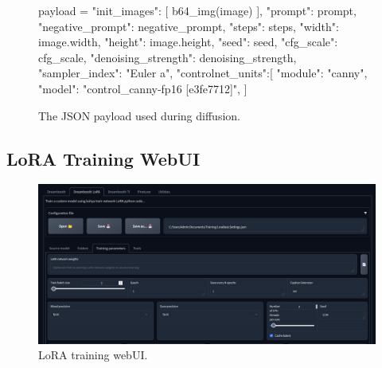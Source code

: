 \documentclass[sn-mathphys,Numbered]{sn-jnl}
\theoremstyle{thmstyleone}%
\theoremstyle{thmstyletwo}%
\theoremstyle{thmstylethree}%
\begin{document}
\begin{figure}
\begin{python}
	payload = {
		"init_images": [
		b64_img(image)
		],
		"prompt": prompt,
		"negative_prompt": negative_prompt,
		"steps": steps,
		"width": image.width,
		"height": image.height,
		"seed": seed,
		"cfg_scale": cfg_scale,
		"denoising_strength": denoising_strength,
		"sampler_index": "Euler a",
		"controlnet_units":[
		{
			"module": "canny",
			"model": "control_canny-fp16 [e3fe7712]",
		}
		]
	}
\end{python}
\caption{The JSON payload used during diffusion.}\label{fig:jsonpayload}
\end{figure}


\subsection{LoRA Training WebUI} \label{sec:lora_training_webui}

\begin{figure}[H]
	\centering
	\includegraphics[width=15cm, keepaspectratio]{img/project_img/lora.png} 
	\caption{LoRA training webUI.}
	\label{fig:lora-webui}
\end{figure}
\end{document}
